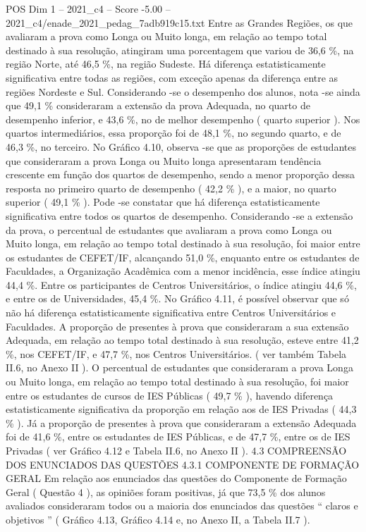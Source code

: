 \begin{textsample}{POS Dim 1 – 2021\_c4 – Score -5.00 – 2021\_c4/enade\_2021\_pedag\_7adb919c15.txt}
Entre as Grandes Regiões, os que avaliaram a prova como Longa ou Muito longa, em relação ao tempo total destinado à sua resolução, atingiram uma porcentagem que variou de 36,6 \%, na região Norte, até 46,5 \%, na região Sudeste.
Há diferença estatisticamente significativa entre todas as regiões, com exceção apenas da diferença entre as regiões Nordeste e Sul.
Considerando -se o desempenho dos alunos, nota -se ainda que 49,1 \% consideraram a extensão da prova Adequada, no quarto de desempenho inferior, e 43,6 \%, no de melhor desempenho ( quarto superior ).
Nos quartos intermediários, essa proporção foi de 48,1 \%, no segundo quarto, e de 46,3 \%, no terceiro.
No Gráfico 4.10, observa -se que as proporções de estudantes que consideraram a prova Longa ou Muito longa apresentaram tendência crescente em função dos quartos de desempenho, sendo a menor proporção dessa resposta no primeiro quarto de desempenho ( 42,2 \% ), e a maior, no quarto superior ( 49,1 \% ).
Pode -se constatar que há diferença estatisticamente significativa entre todos os quartos de desempenho.
Considerando -se a extensão da prova, o percentual de estudantes que avaliaram a prova como Longa ou Muito longa, em relação ao tempo total destinado à sua resolução, foi maior entre os estudantes de CEFET/IF, alcançando 51,0 \%, enquanto entre os estudantes de Faculdades, a Organização Acadêmica com a menor incidência, esse índice atingiu 44,4 \%.
Entre os participantes de Centros Universitários, o índice atingiu 44,6 \%, e entre os de Universidades, 45,4 \%.
No Gráfico 4.11, é possível observar que só não há diferença estatisticamente significativa entre Centros Universitários e Faculdades.
A proporção de presentes à prova que consideraram a sua extensão Adequada, em relação ao tempo total destinado à sua resolução, esteve entre 41,2 \%, nos CEFET/IF, e 47,7 \%, nos Centros Universitários. ( ver também Tabela II.6, no Anexo II ).
O percentual de estudantes que consideraram a prova Longa ou Muito longa, em relação ao tempo total destinado à sua resolução, foi maior entre os estudantes de cursos de IES Públicas ( 49,7 \% ), havendo diferença estatisticamente significativa da proporção em relação aos de IES Privadas ( 44,3 \% ).
Já a proporção de presentes à prova que consideraram a extensão Adequada foi de 41,6 \%, entre os estudantes de IES Públicas, e de 47,7 \%, entre os de IES Privadas ( ver Gráfico 4.12 e Tabela II.6, no Anexo II ). 4.3 COMPREENSÃO DOS ENUNCIADOS DAS QUESTÕES 4.3.1 COMPONENTE DE FORMAÇÃO GERAL Em relação aos enunciados das questões do Componente de Formação Geral ( Questão 4 ), as opiniões foram positivas, já que 73,5 \% dos alunos avaliados consideraram todos ou a maioria dos enunciados das questões “ claros e objetivos ” ( Gráfico 4.13, Gráfico 4.14 e, no Anexo II, a Tabela II.7 ).

\end{textsample}

